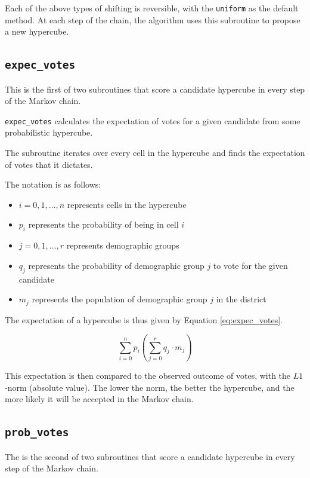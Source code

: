\documentclass[fleqn,10pt]{style}
\begin{document}
Each of the above types of shifting is reversible, with the \texttt{uniform} as the default method. At each step of the chain, the algorithm uses this subroutine to propose a new hypercube.

\subsection{\texttt{expec\_votes}}

This is the first of two subroutines that score a candidate hypercube in every step of the Markov chain.

\texttt{expec\_votes} calculates the expectation of votes for a given candidate from some probabilistic hypercube.

The subroutine iterates over every cell in the hypercube and finds the expectation of votes that it dictates.

The notation is as follows:

\begin{itemize}[noitemsep]
  \item $i = 0, 1, \dots, n$ represents cells in the hypercube
  \item $p_i$ represents the probability of being in cell $i$
  \item $j = 0, 1, \dots, r$ represents demographic groups
  \item $q_j$ represents the probability of demographic group $j$ to vote for the given candidate
  \item $m_j$ represents the population of demographic group $j$ in the district
\end{itemize}

The expectation of a hypercube is thus given by Equation \ref{eq:expec_votes}.

\begin{equation}
 \sum_{i = 0}^n p_i \left(\sum_{j = 0}^r q_j \cdot m_j\right)
 \label{eq:expec_votes}
\end{equation}

This expectation is then compared to the observed outcome of votes, with the $L1$-norm (absolute value). The lower the norm, the better the hypercube, and the more likely it will be accepted in the Markov chain.

\subsection{\texttt{prob\_votes}}

The is the second of two subroutines that score a candidate hypercube in every step of the Markov chain.
\end{document}
